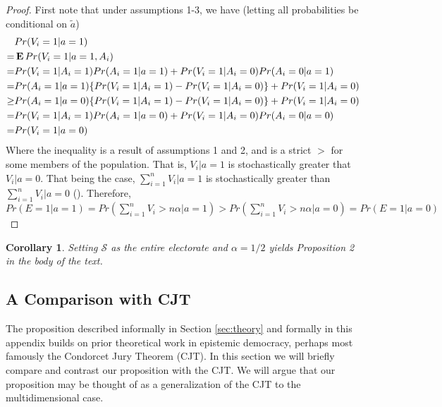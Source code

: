 \documentclass[11pt]{article}
\newcommand{\E}{\mathop{\bf E\/}}
\newtheorem{cor}{Corollary}
\begin{document}
\begin{proof}
First note that
under assumptions 1-3, we have (letting all probabilities be conditional on $\tilde{a}$)
\begin{align*}
&Pr(V_i=1|a=1)\\
=&\E Pr(V_i=1|a=1,A_i)\\
=&Pr(V_i=1|A_i=1)Pr(A_i=1|a=1)+Pr(V_i=1|A_i=0)Pr(A_i=0|a=1)\\
=&Pr(A_i=1|a=1)\{Pr(V_i=1|A_i=1)-Pr(V_i=1|A_i=0)\}+Pr(V_i=1|A_i=0)\\
\ge&Pr(A_i=1|a=0)\{Pr(V_i=1|A_i=1)-Pr(V_i=1|A_i=0)\}+Pr(V_i=1|A_i=0)\\
=&Pr(V_i=1|A_i=1)Pr(A_i=1|a=0)+Pr(V_i=1|A_i=0)Pr(A_i=0|a=0)\\
=&Pr(V_i=1|a=0)
\end{align*}
Where the inequality is a result of assumptions 1 and 2, and is a strict $>$ for some members of the population.
That is, $V_i|a=1$ is stochastically greater that $V_i|a=0$. That being the case, $\sum_{i=1}^n V_i |a=1$ is stochastically greater than $\sum_{i=1}^n V_i |a=0$ (\citet{shaked2007stochastic}).
Therefore, $Pr(E=1|a=1)=Pr(\sum_{i=1}^n V_i >n\alpha|a=1)>Pr(\sum_{i=1}^n V_i>n\alpha |a=0)=Pr(E=1|a=0)$
\end{proof}

\begin{cor}
Setting $\mathcal{S}$ as the entire electorate and $\alpha=1/2$
yields Proposition 2 in the body of the text.
\end{cor}

\subsection{A Comparison with CJT}\label{sec:cjt-compare}

The proposition described informally in Section \ref{sec:theory} and formally in this appendix builds on prior theoretical work in epistemic democracy, perhaps most famously the Condorcet Jury Theorem (CJT).
In this section we will briefly compare and contrast our proposition with the CJT.
We will argue that our proposition may be thought of as a generalization of the CJT to the multidimensional case.
\end{document}
